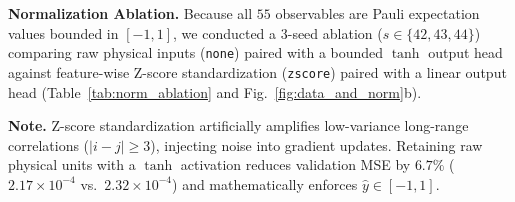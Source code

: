 \documentclass[10pt,a4paper]{article}
\begin{document}
\textbf{Normalization Ablation.} Because all $55$ observables are Pauli expectation values bounded in $[-1, 1]$, we conducted a 3-seed ablation ($s \in \{42, 43, 44\}$) comparing raw physical inputs (\texttt{none}) paired with a bounded $\tanh$ output head against feature-wise Z-score standardization (\texttt{zscore}) paired with a linear output head (Table~\ref{tab:norm_ablation} and Fig.~\ref{fig:data_and_norm}b).

\begin{table}[!htbp]
    \centering
    \small
    \caption{Empirical normalization ablation across 3 random seeds (Student-$t$ 95\% CI) on the validation set.}
    \label{tab:norm_ablation}
\end{table}

\textbf{Note.} Z-score standardization artificially amplifies low-variance long-range correlations ($|i-j| \ge 3$), injecting noise into gradient updates. Retaining raw physical units with a $\tanh$ activation reduces validation MSE by $6.7\%$ ($2.17 \times 10^{-4}$ vs.\ $2.32 \times 10^{-4}$) and mathematically enforces $\hat{y} \in [-1, 1]$.
\end{document}
